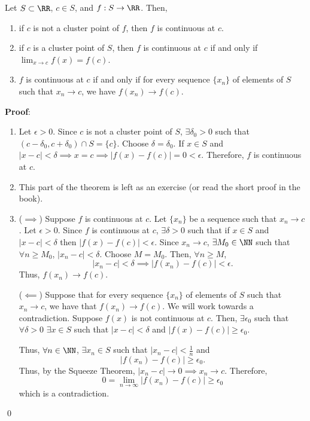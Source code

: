 \begin{theorem}
Let $S\subset \RR$, $c\in S$, and $f:S\to \RR$. Then, 
\begin{enumerate}
    \item if $c$ is not a cluster point of $f$, then $f$ is continuous at $c$.
    \item if $c$ is a cluster point of $S$, then $f$ is continuous at $c$ if and only if $\lim_{x\to c} f(x) = f(c)$.
    \item $f$ is continuous at $c$ if and only if for every sequence $\{x_n\}$ of elements of $S$ such that $x_n \to c$, we have $f(x_n) \to f(c)$.
\end{enumerate}
\end{theorem}
\textbf{Proof}:
\begin{enumerate}
    \item Let $\epsilon>0$. Since $c$ is not a cluster point of $S$, $\exists \delta_0>0$ such that $(c-\delta_0, c+\delta_0) \cap S = \{c\}$. Choose $\delta = \delta_0$. If $x\in S$ and $|x-c| < \delta \implies x = c\implies |f(x) -f(c)| = 0< \epsilon$. Therefore, $f$ is continuous at $c$.
    \item This part of the theorem is left as an exercise (or read the short proof in the book).
    \item ($\implies$) Suppose $f$ is continuous at $c$. Let $\{x_n\}$ be a sequence such that $x_n\to c$. Let $\epsilon>0$. Since $f$ is continuous at $c$, $\exists \delta >0$ such that if $x\in S$ and $|x-c| < \delta$ then $|f(x) - f(c)| < \epsilon$. Since $x_n\to c$, $\exists M_0 \in \NN$ such that $\forall n\geq M_0$, $|x_n-c|<\delta$. Choose $M = M_0$. Then, $\forall n \geq M$, 
    \[
    |x_n-c|<\delta \implies |f(x_n) - f(c)|<\epsilon.
    \]
    Thus, $f(x_n) \to f(c)$.
    
    ($\impliedby$) Suppose that for every sequence $\{x_n\}$ of elements of $S$ such that $x_n\to c$, we have that $f(x_n) \to f(c)$. We will work towards a contradiction. Suppose $f(x)$ is not continuous at $c$. Then, $\exists \epsilon_0$ such that $\forall \delta>0$ $\exists x\in S$ such that $|x-c| <\delta$ and $|f(x) - f(c)| \geq \epsilon_0.$
    
    Thus, $\forall n\in \NN$, $\exists x_n\in S$ such that $|x_n-c|< \frac{1}{n}$ and 
    \[
    |f(x_n) - f(c)|\geq \epsilon_0.
    \]
    Thus, by the Squeeze Theorem, $|x_n-c|\to 0\implies x_n\to c$. Therefore, 
    \[
    0 = \lim_{n\to \infty} |f(x_n) - f(c)| \geq \epsilon_0
    \]
    which is a contradiction.
\end{enumerate} \qed 

